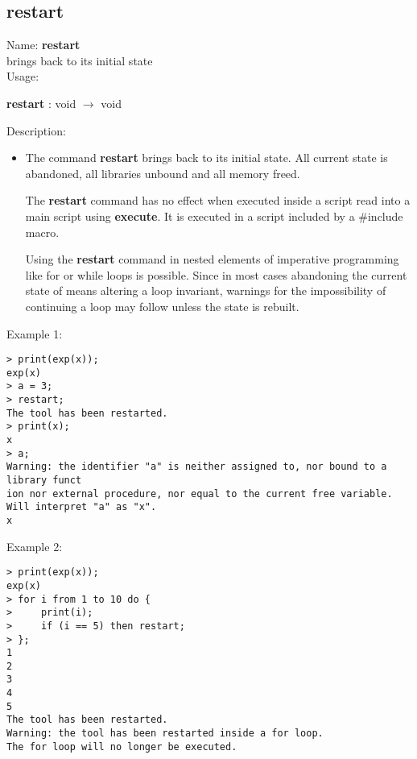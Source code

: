 \subsection{restart}
\label{labrestart}
\noindent Name: \textbf{restart}\\
brings \sollya back to its initial state\\
\noindent Usage: 
\begin{center}
\textbf{restart} : \textsf{void} $\rightarrow$ \textsf{void}\\
\end{center}
\noindent Description: \begin{itemize}

\item The command \textbf{restart} brings \sollya back to its initial state.  All
   current state is abandoned, all libraries unbound and all memory freed.
    
   The \textbf{restart} command has no effect when executed inside a \sollya
   script read into a main \sollya script using \textbf{execute}. It is executed
   in a \sollya script included by a $\#$include macro.
    
   Using the \textbf{restart} command in nested elements of imperative
   programming like for or while loops is possible. Since in most cases
   abandoning the current state of \sollya means altering a loop
   invariant, warnings for the impossibility of continuing a loop may
   follow unless the state is rebuilt.
\end{itemize}
\noindent Example 1: 
\begin{center}\begin{minipage}{15cm}\begin{Verbatim}[frame=single]
> print(exp(x));
exp(x)
> a = 3;
> restart;
The tool has been restarted.
> print(x);
x
> a;
Warning: the identifier "a" is neither assigned to, nor bound to a library funct
ion nor external procedure, nor equal to the current free variable.
Will interpret "a" as "x".
x
\end{Verbatim}
\end{minipage}\end{center}
\noindent Example 2: 
\begin{center}\begin{minipage}{15cm}\begin{Verbatim}[frame=single]
> print(exp(x));
exp(x)
> for i from 1 to 10 do {
>     print(i);
>     if (i == 5) then restart;
> };
1
2
3
4
5
The tool has been restarted.
Warning: the tool has been restarted inside a for loop.
The for loop will no longer be executed.
\end{Verbatim}
\end{minipage}\end{center}
